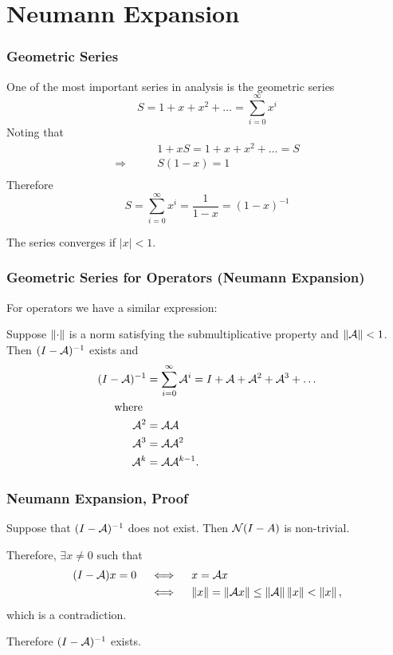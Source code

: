 \documentclass{beamer}
\begin{document}
\section{Neumann Expansion}
\frame{\sectionpage}

\begin{frame}\frametitle{Geometric Series}
	One of the most important series in analysis is the geometric series
	\[ 
	S = 1 + x + x^2 + \ldots = \sum_{i=0}^{\infty}x^i 
	\]
	Noting that 
	\begin{align*}
		& 1 + xS = 1 + x + x^2 + \ldots = S \\
		\Rightarrow \qquad & S(1-x) = 1 \\
	\end{align*}
	Therefore 
	\[
	S = \sum_{i=0}^{\infty} x^i = \frac{1}{1-x} = (1-x)^{-1} 
	\]

	\vfill
	
	The series converges if $|x| < 1$.
\end{frame}

\begin{frame}\frametitle{Geometric Series for Operators (Neumann Expansion)}
	For operators we have a similar expression:
	\begin{theorem}
	Suppose $\left\| \cdot \right\|$ is a norm satisfying the submultiplicative property and $\left\|\mathcal{A}\right\| < 1$.  Then $(I-\mathcal{A})^{-1}$ exists and
	\begin{align*}
		(I-\mathcal{A})^{-1} &= \sum_{i=0}^{\infty} \mathcal{A}^i 
			= I + \mathcal{A} + \mathcal{A}^2 + \mathcal{A}^3 + \ldots\\
		\text{ where } & \\
		\mathcal{A}^2 &= \mathcal{A}\mathcal{A} \\
		\mathcal{A}^3 &= \mathcal{A}\mathcal{A}^2 \\
		\mathcal{A}^k &= \mathcal{A}\mathcal{A}^{k-1}.
	\end{align*}
\end{theorem}
\end{frame}

\begin{frame}\frametitle{Neumann Expansion, Proof}
	Suppose that $(I-\mathcal{A})^{-1}$ does not exist.  Then $\mathcal{N}(I-A)$ is non-trivial.
	
	Therefore, $\exists x \neq 0$ such that 
	\begin{align*}
	(I-\mathcal{A})x = 0 \quad &\iff \quad x = \mathcal{A} x \\
	&\iff \quad \left\| x \right\| = \left\|\mathcal{A} x \right\| \leq \left\| \mathcal{A} \right\|\left\| x \right\| < \left\| x \right\|,
	\end{align*}
	which is a contradiction.  
	
	\vfill
	
	Therefore $(I-\mathcal{A})^{-1}$ exists.
\end{frame}
\end{document}
